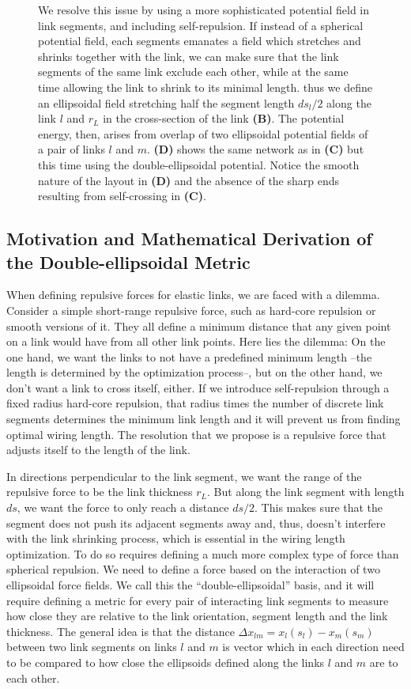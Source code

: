 \documentclass[nofootinbib,preprint,floatfix,titlepage,superscriptaddress]{revtex4} %
\begin{document}
\begin{figure}
{    We resolve this issue by using a more sophisticated potential field in link segments, and including self-repulsion. 
    If instead of a spherical potential field, each segments emanates a field which stretches and shrinks together with the link, we can make sure that the link segments of the same link exclude each other, while at the same time allowing the link to shrink to its minimal length.
    thus we define an ellipsoidal field stretching half the segment length $ds_l/2$ along the link $l$ and $r_L$ in the cross-section of the link {\bf(B)}. 
    The potential energy, then, arises from overlap of two ellipsoidal potential fields of a pair of links $l$ and $m$. {\bf(D)} shows the same network as in {\bf(C)} but this time using the double-ellipsoidal potential. 
    Notice the smooth nature of the layout in {\bf(D)} and the absence of the sharp ends resulting from self-crossing in {\bf(C)}.  
    }
    \label{fig:ell}
\end{figure}

\subsection{Motivation and Mathematical Derivation of the Double-ellipsoidal Metric}
When defining repulsive forces for elastic links, we are faced with a dilemma. 
Consider a simple short-range repulsive force, such as hard-core repulsion or smooth versions of it. 
They all define a minimum distance that any given point on a link would have from all other link points. 
Here lies the dilemma: 
On the one hand, we want the links to not have a predefined minimum length --the length is determined by the optimization process--, but on the other hand, we don't want a link to cross itself, either. 
If we introduce self-repulsion through a fixed radius hard-core repulsion, that radius times the number of discrete link segments determines the minimum link length and it will prevent us from finding optimal wiring length. 
The resolution that we propose is a repulsive force that adjusts itself to the length of the link. 

In directions perpendicular to the link segment, we want the range of the repulsive force to be the link thickness $r_L$. But along the link segment with length $ds$, we want the force to only reach a distance $ds/2$. 
This makes sure that the segment does not push its adjacent segments away and, thus, doesn't interfere with the link shrinking process, which is essential in the wiring length optimization.
To do so requires defining a much more complex type of force than spherical repulsion. 
We need to define a force based on the interaction of two ellipsoidal force fields. 
We call this the ``double-ellipsoidal'' basis, and it will require defining a metric for every pair of interacting link segments to measure how close they are relative to the link orientation, segment length and the link thickness. 
The general idea is that the distance $\Delta x_{lm} = x_l(s_l) - x_m(s_m)$ between two link segments on links $l$ and $m$ is vector which in each direction need to be compared to how close the ellipsoids defined along the links $l$ and $m$ are to each other. 
\end{document}
